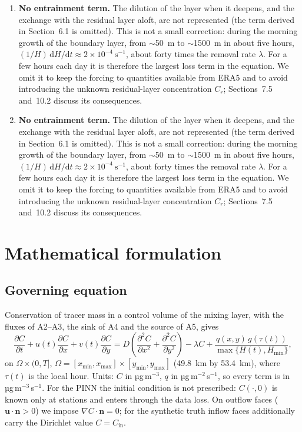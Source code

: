 \documentclass[11pt,a4paper]{article}
\newcommand{\pd}[2]{\frac{\partial #1}{\partial #2}}
\begin{document}
\begin{enumerate}
\item[A7] \textbf{No entrainment term.} The dilution of the layer when it
  deepens, and the exchange with the residual layer aloft, are not represented
  (the term derived in Section~6.1 is omitted). This is not a small
  correction: during the morning growth of the boundary layer, from
  $\sim$50~m to $\sim$1500~m in about five hours,
  $(1/H)\,\mathrm{d}H/\mathrm{d}t \approx 2\times10^{-4}\ \mathrm{s^{-1}}$,
  about forty times the removal rate $\lambda$. For a few hours each day it is
  therefore the largest loss term in the equation. We omit it to keep the
  forcing to quantities available from ERA5 and to avoid introducing the
  unknown residual-layer concentration $C_r$; Sections~7.5 and~10.2 discuss
  its consequences.\item[A7] \textbf{No entrainment term.} The dilution of the layer when it
  deepens, and the exchange with the residual layer aloft, are not represented
  (the term derived in Section~6.1 is omitted). This is not a small
  correction: during the morning growth of the boundary layer, from
  $\sim$50~m to $\sim$1500~m in about five hours,
  $(1/H)\,\mathrm{d}H/\mathrm{d}t \approx 2\times10^{-4}\ \mathrm{s^{-1}}$,
  about forty times the removal rate $\lambda$. For a few hours each day it is
  therefore the largest loss term in the equation. We omit it to keep the
  forcing to quantities available from ERA5 and to avoid introducing the
  unknown residual-layer concentration $C_r$; Sections~7.5 and~10.2 discuss
  its consequences.
\end{enumerate}

\section{Mathematical formulation}
\label{sec:model}
\subsection{Governing equation}
Conservation of tracer mass in a control volume of the mixing layer, with the fluxes of A2--A3, the sink of
A4 and the source of A5, gives
\begin{equation}
\pd{C}{t} + u(t)\pd{C}{x} + v(t)\pd{C}{y} = D\left(\pd{^2C}{x^2}+\pd{^2C}{y^2}\right) - \lambda C
+ \frac{q(x,y)\,g(\tau(t))}{\max\{H(t),H_{\min}\}},
\label{eq:adr}
\end{equation}
on $\Omega\times(0,T]$, $\Omega=[x_{\min},x_{\max}]\times[y_{\min},y_{\max}]$ (\SI{49.8}{km} by \SI{53.4}{km}),
where $\tau(t)$ is the local hour. Units: $C$ in µg\,m$^{-3}$, $q$ in µg\,m$^{-2}$\,s$^{-1}$, so every term is in
µg\,m$^{-3}$\,s$^{-1}$. For the PINN the initial condition is not prescribed: $C(\cdot,0)$ is known only at
stations and enters through the data loss. On outflow faces ($\bm u\cdot\bm n>0$) we impose
$\nabla C\cdot\bm n=0$; for the synthetic truth inflow faces additionally carry the Dirichlet value
$C=C_{\mathrm{in}}$.
\end{document}
